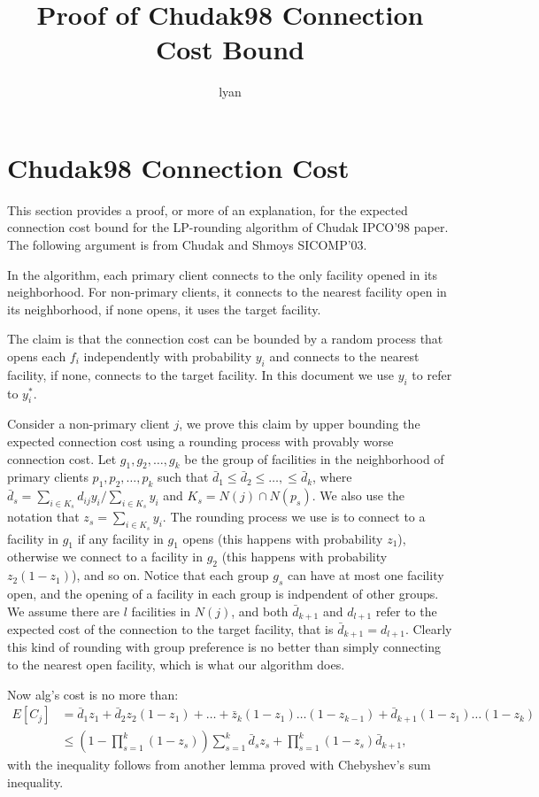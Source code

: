 \documentclass{article}
\title{Proof of Chudak98 Connection Cost Bound}
\author{lyan}
\begin{document}
\maketitle
\section{Chudak98 Connection Cost}
This section provides a proof, or more of an explanation, for the
expected connection cost bound for the LP-rounding algorithm of Chudak
IPCO'98 paper. The following argument is from Chudak and Shmoys
SICOMP'03.

In the algorithm, each primary client connects to the only facility
opened in its neighborhood. For non-primary clients, it connects to
the nearest facility open in its neighborhood, if none opens, it uses
the target facility.

The claim is that the connection cost can be bounded by a random
process that opens each $f_i$ independently with probability $y_i$ and
connects to the nearest facility, if none, connects to the target
facility. In this document we use $y_i$ to refer to $y_i^\ast$.

Consider a non-primary client $j$, we prove this claim by upper
bounding the expected connection cost using a rounding process with
provably worse connection cost. Let $g_1, g_2, \ldots, g_k$ be the
group of facilities in the neighborhood of primary clients $p_1, p_2,
\ldots, p_k$ such that $\bar d_1 \leq \bar d_2 \leq \ldots, \leq \bar
d_k$, where $\bar d_s = \sum_{i \in K_s} d_{ij} y_{i} / \sum_{i \in
  K_s} y_i$ and $K_s = N(j) \cap N(p_s)$. We also use the notation
that $z_s = \sum_{i\in K_s} y_i$. The rounding process we use is to
connect to a facility in $g_1$ if any facility in $g_1$ opens (this
happens with probability $z_1$), otherwise we connect to a facility in
$g_2$ (this happens with probability $z_2(1-z_1)$), and so on. Notice
that each group $g_s$ can have at most one facility open, and the
opening of a facility in each group is indpendent of other groups. We
assume there are $l$ facilities in $N(j)$, and both $\bar d_{k+1}$ and
$d_{l+1}$ refer to the expected cost of the connection to the target
facility, that is $\bar d_{k+1} = d_{l+1}$. Clearly this kind of
rounding with group preference is no better than simply connecting to
the nearest open facility, which is what our algorithm does.

Now alg's cost is no more than:
\begin{align*}
  E[C_j] &= \bar d_1 z_1 + \bar d_2 z_2 (1-z_1) + \ldots + \bar z_k
  (1-z_1)\ldots(1-z_{k-1}) + \bar d_{k+1} (1-z_1) \ldots (1-z_k)\\
  &\leq (1 - \prod_{s=1}^k (1-z_s)) \sum_{s=1}^k \bar d_s z_s +
  \prod_{s=1}^k (1-z_s) \bar d_{k+1},
\end{align*}
with the inequality follows from another lemma proved with Chebyshev's
sum inequality.
\end{document}
